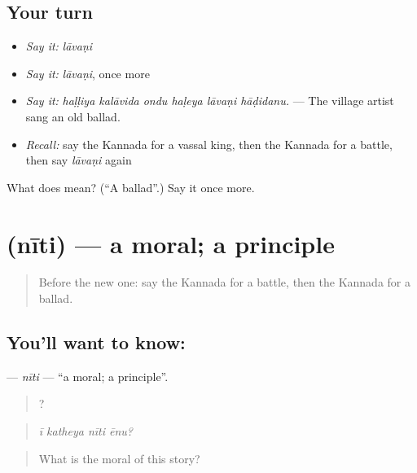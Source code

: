\subsection*{Your turn}
\begin{itemize}
\raggedright
  \item \emph{Say it:} \emph{lāvaṇi}
  \item \emph{Say it:} \emph{lāvaṇi}, once more
  \item \emph{Say it:} \emph{haḷḷiya kalāvida ondu haḷeya lāvaṇi hāḍidanu.} — The village artist sang an old ballad.
  \item \emph{Recall:} say the Kannada for a vassal king, then the Kannada for a battle, then say \emph{lāvaṇi} again
\end{itemize}

\begin{tcolorbox}[breakable,colback=teal!4,colframe=teal!35!black,title={Before you move on}]
What does  mean? (\textquotedblleft{}A ballad\textquotedblright{}.) Say it once more.
\end{tcolorbox}
\section[\texorpdfstring{\kn{ನೀತಿ} (nīti)}{ನೀತಿ (nīti)}]{ (nīti) — a moral; a principle}

\label{lesson:KA-C356-niti}



\begin{quote}
Before the new one: say the Kannada for a battle, then the Kannada for a ballad.
\end{quote}

\subsection*{You'll want to know: }
\textbf{} — \emph{nīti} — \textquotedblleft{}a moral; a principle\textquotedblright{}.

\begin{quote}
   ?
\end{quote}

\begin{quote}
\emph{ī katheya nīti ēnu?}
\end{quote}

\begin{quote}
What is the moral of this story?
\end{quote}

